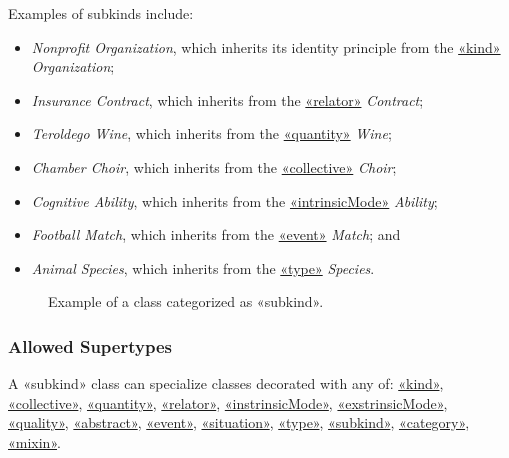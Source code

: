 Examples of subkinds include:
\begin{itemize}
    \item \textit{Nonprofit Organization}, which inherits its identity principle from the \hyperref[stereotype:kind]{«kind»} \textit{Organization};
    \item \textit{Insurance Contract}, which inherits from the \hyperref[stereotype:relator]{«relator»} \textit{Contract};
    \item \textit{Teroldego Wine}, which inherits from the \hyperref[stereotype:quantity]{«quantity»} \textit{Wine};
    \item \textit{Chamber Choir}, which inherits from the \hyperref[stereotype:collective]{«collective»} \textit{Choir};
    \item \textit{Cognitive Ability}, which inherits from the \hyperref[stereotype:intrinsicMode]{«intrinsicMode»} \textit{Ability};
    \item \textit{Football Match}, which inherits from the \hyperref[stereotype:event]{«event»} \textit{Match}; and
    \item \textit{Animal Species}, which inherits from the \hyperref[stereotype:type]{«type»} \textit{Species}.
\end{itemize}

\begin{figure}[h]
    \centering
    
    \caption{Example of a class categorized as «subkind».}
    \label{fig:subkind-example}
\end{figure}


\subsubsection{Allowed Supertypes}

A «subkind» class can specialize classes decorated with any of: 
\hyperref[stereotype:kind]{«kind»}, \hyperref[stereotype:collective]{«collective»}, \hyperref[stereotype:quantity]{«quantity»}, \hyperref[stereotype:relator]{«relator»}, \hyperref[stereotype:intrinsicMode]{«instrinsicMode»},
\hyperref[stereotype:extrinsicMode]{«exstrinsicMode»}, \hyperref[stereotype:quality]{«quality»}, \hyperref[stereotype:abstract]{«abstract»}, \hyperref[stereotype:event]{«event»}, \hyperref[stereotype:situation]{«situation»}, \hyperref[stereotype:type]{«type»}, \hyperref[stereotype:subkind]{«subkind»}, \hyperref[stereotype:category]{«category»}, \hyperref[stereotype:mixin]{«mixin»}.

